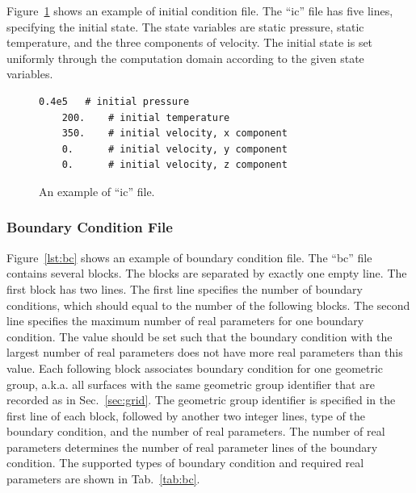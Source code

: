 \documentclass[]{article}
\begin{document}
Figure~\ref{lst:ic} shows an example of initial condition file.
The ``ic'' file has five lines, specifying the initial state.
The state variables are static pressure, static temperature, and the three components of velocity.
The initial state is set uniformly through the computation domain according to the given state
variables.

\begin{figure}[h!]
  \begin{lstlisting}[backgroundcolor=\color{lightgray}]
    0.4e5	# initial pressure
    200.	# initial temperature
    350.	# initial velocity, x component
    0.		# initial velocity, y component
    0.		# initial velocity, z component
  \end{lstlisting}
  \caption{An example of ``ic'' file.}
  \label{lst:ic}
\end{figure}

\subsubsection{Boundary Condition File}

Figure~\ref{lst:bc} shows an example of boundary condition file.
The ``bc'' file contains several blocks.
The blocks are separated by exactly one empty line.
The first block has two lines.
The first line specifies the number of boundary conditions, which should equal to the number of the
following blocks.
The second line specifies the maximum number of real parameters for one boundary condition.
The value should be set such that the boundary condition with the largest number of real parameters
does not have more real parameters than this value.
Each following block associates boundary condition for one geometric group, a.k.a. all surfaces with
the same geometric group identifier that are recorded as in Sec.~\ref{sec:grid}.
The geometric group identifier is specified in the first line of each block, followed by another two
integer lines, type of the boundary condition, and the number of real parameters.
The number of real parameters determines the number of real parameter lines of the boundary
condition.
The supported types of boundary condition and required real parameters are shown in
Tab.~\ref{tab:bc}.
\end{document}
